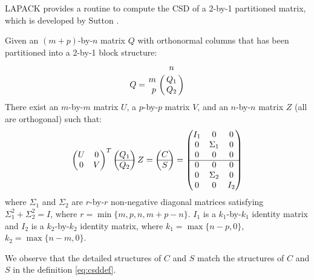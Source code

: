 \begin{remark}
{\rm  
LAPACK provides a routine to compute the CSD of 
a 2-by-1 partitioned matrix, which is developed 
by Sutton \cite{sutton2009computing}.  
    
Given an $(m+p)$-by-$n$ matrix $Q$ with orthonormal columns that has been partitioned into a 2-by-1 block structure: 
        \begin{displaymath}
            Q = \bordermatrix{ & n  \cr
            \hfill m & Q_1 \cr
            \hfill p & Q_2}
        \end{displaymath}
    There exist an $m$-by-$m$ matrix $U$, a $p$-by-$p$ matrix $V$, and an $n$-by-$n$ matrix $Z$ (all are orthogonal) such that:
        \begin{displaymath}
            \begin{pmatrix}
                U & 0 \\
                0 & V
            \end{pmatrix}^{T}
            \begin{pmatrix}
                Q_1 \\
                \hline
                Q_2
            \end{pmatrix}Z = 
            \begin{pmatrix}
                C \\
                \hline
                S
            \end{pmatrix} =
            \begin{pmatrix}
                I_1 & 0 & 0 \\
                0 & \Sigma_{1} & 0 \\
                0 & 0 & 0 \\
                \cline{1-3} 
                0 & 0 & 0 \\
                0 & \Sigma_{2} & 0 \\
                0 & 0 & I_2
            \end{pmatrix}
        \end{displaymath}
where $\Sigma_{1}$ and $\Sigma_{2}$ are $r$-by-$r$ non-negative diagonal matrices 
satisfying $\Sigma_{1}^{2} + \Sigma_{2}^{2} = I$, where $r = \min\{m,p,n,m+p-n\}$. 
$I_1$ is a $k_1$-by-$k_1$ identity matrix and $I_2$ is 
a $k_2$-by-$k_2$ identity matrix, where 
$k_1 = \max\{n-p,0\}$, $k_2 = \max\{n-m,0\}$. 

We observe that the detailed structures of $C$ and $S$ match
the structures of $C$ and $S$ in the definition \eqref{eq:csddef}. 
}
\end{remark} 

